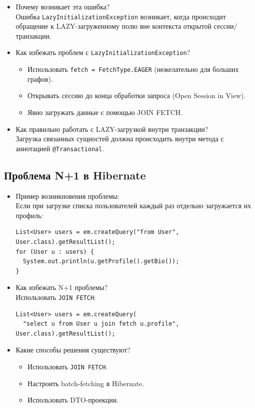 \documentclass[a4paper,14pt]{article}
\begin{document}
\begin{itemize}
\item Почему возникает эта ошибка? \\
Ошибка \texttt{LazyInitializationException} возникает, когда происходит обращение к LAZY-загруженному полю вне контекста открытой сессии/транзакции.

\item Как избежать проблем с \texttt{LazyInitializationException}? \\
\begin{itemize}
  \item Использовать \texttt{fetch = FetchType.EAGER} (нежелательно для больших графов).
  \item Открывать сессию до конца обработки запроса (Open Session in View).
  \item Явно загружать данные с помощью JOIN FETCH.
\end{itemize}

\item Как правильно работать с LAZY-загрузкой внутри транзакции? \\
Загрузка связанных сущностей должна происходить внутри метода с аннотацией \texttt{@Transactional}.
\end{itemize}

\subsection{Проблема N+1 в Hibernate}

\begin{itemize}
\item Пример возникновения проблемы: \\
Если при загрузке списка пользователей каждый раз отдельно загружается их профиль:
\begin{lstlisting}[style=javastyle]
List<User> users = em.createQuery("from User", User.class).getResultList();
for (User u : users) {
  System.out.println(u.getProfile().getBio());
}
\end{lstlisting}

\item Как избежать N+1 проблемы? \\
Использовать \texttt{JOIN FETCH}:
\begin{lstlisting}[style=javastyle]
List<User> users = em.createQuery(
  "select u from User u join fetch u.profile", User.class).getResultList();
\end{lstlisting}

\item Какие способы решения существуют? \\
\begin{itemize}
  \item Использовать \texttt{JOIN FETCH}.
  \item Настроить batch-fetching в Hibernate.
  \item Использовать DTO-проекции.
\end{itemize}
\end{itemize}
\end{document}
